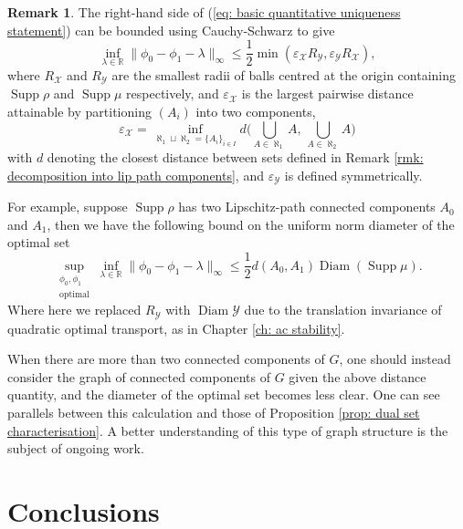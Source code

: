 \documentclass[11pt, oneside, titlepage]{book}
\theoremstyle{plain}
\theoremstyle{definition}
\newtheorem{remark}[theorem]{Remark}
\newcommand{\R}{\mathbb{R}}
\newcommand{\X}{\mathcal{X}}
\newcommand{\Y}{\mathcal{Y}}
\DeclareMathOperator{\supp}{Supp}
\DeclareMathOperator{\diam}{Diam}
\begin{document}
\begin{remark}
    The right-hand side of (\ref{eq: basic quantitative uniqueness statement}) can be bounded using Cauchy-Schwarz to give
    \begin{equation*}
        \inf_{\lambda \in \R} \| \phi_0 - \phi_1 - \lambda\|_{\infty} \leq \frac{1}{2} \min( \varepsilon_\X R_\Y, \varepsilon_\Y R_\X),
    \end{equation*}
    where $R_\X$ and $R_\Y$ are the smallest radii of balls centred at the origin containing $\supp \rho$ and $\supp \mu$ respectively, and $\varepsilon_\X$ is the largest pairwise distance attainable by partitioning $(A_i)$ into two components,
    \begin{equation*}
        \varepsilon_\X = \inf_{\aleph_1\sqcup \aleph_2 = \{ A_i\}_{i \in I}} d\Big(\bigcup_{A \in \aleph_1} A,\, \bigcup_{A \in \aleph_2}A\Big)
    \end{equation*}
    with $d$ denoting the closest distance between sets defined in Remark \ref{rmk: decomposition into lip path components}, and $\varepsilon_\Y$ is defined symmetrically.

    For example, suppose $\supp \rho$ has two Lipschitz-path connected components $A_0$ and $A_1$, then we have the following bound on the uniform norm diameter of the optimal set
    \begin{equation*}
        \sup_{\substack{\phi_0, \phi_1\\\text{optimal}}}\inf_{\lambda \in \R} \| \phi_0 - \phi_1 - \lambda\|_{\infty} \leq \frac{1}{2} d(A_0, A_1) \diam(\supp \mu).
    \end{equation*}
    Where here we replaced $R_\Y$ with $\diam \Y$ due to the translation invariance of quadratic optimal transport, as in Chapter \ref{ch: ac stability}.

    When there are more than two connected components of $G$, one should instead consider the graph of connected components of $G$ given the above distance quantity, and the diameter of the optimal set becomes less clear. One can see parallels between this calculation and those of Proposition \ref{prop: dual set characterisation}. A better understanding of this type of graph structure is the subject of ongoing work.
\end{remark}



\chapter{Conclusions}
\end{document}
